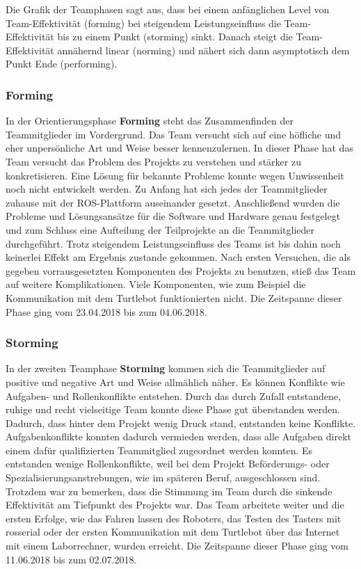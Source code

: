 \documentclass[a4paper,12pt,headsepline]{scrartcl}
\begin{document}
		Die Grafik der Teamphasen sagt aus, dass bei einem anfänglichen Level von Team-Effektivität (forming) bei steigendem Leistungseinfluss die Team-Effektivität bis zu einem Punkt (storming) sinkt. Danach steigt die Team-Effektivität annähernd linear (norming) und nähert sich dann asymptotisch dem Punkt Ende (performing). 
	\subsubsection{Forming}
		In der Orientierungsphase \textbf{Forming} steht das Zusammenfinden der Teammitglieder im Vordergrund. Das Team versucht sich auf eine höfliche und eher unpersönliche Art und Weise besser kennenzulernen. In dieser Phase hat das Team versucht das Problem des Projekts zu verstehen und stärker zu konkretisieren. Eine Lösung für bekannte Probleme konnte wegen Unwissenheit noch nicht entwickelt werden. Zu Anfang hat sich jedes der Teammitglieder zuhause mit der ROS-Plattform auseinander gesetzt. Anschließend wurden die Probleme und Lösungsansätze für die Software und Hardware genau festgelegt und zum Schluss eine Aufteilung der Teilprojekte an die Teammitglieder durchgeführt. Trotz steigendem Leistungseinfluss des Teams ist bis dahin noch keinerlei Effekt am Ergebnis zustande gekommen. Nach ersten Versuchen, die als gegeben vorrausgesetzten Komponenten des Projekts zu benutzen, stieß das Team auf weitere Komplikationen. Viele Komponenten, wie zum Beispiel die Kommunikation mit dem Turtlebot funktionierten nicht. Die Zeitspanne dieser Phase ging vom 23.04.2018 bis zum 04.06.2018. 
	\subsubsection{Storming}
		In der zweiten Teamphase \textbf{Storming} kommen sich die Teammitglieder auf positive und negative Art und Weise allmählich näher. Es können Konflikte wie Aufgaben- und Rollenkonflikte entstehen. Durch das durch Zufall entstandene, ruhige und recht vielseitige Team konnte diese Phase gut überstanden werden. Dadurch, dass hinter dem Projekt wenig Druck stand, entstanden keine Konflikte. Aufgabenkonflikte konnten dadurch vermieden werden, dass alle Aufgaben direkt einem dafür qualifizierten Teammitglied zugeordnet werden konnten. Es entstanden wenige Rollenkonflikte, weil bei dem Projekt Beförderungs- oder Spezialisierungsanstrebungen, wie im späteren Beruf, ausgeschlossen sind. Trotzdem war zu bemerken, dass die Stimmung im Team durch die sinkende Effektivität am Tiefpunkt des Projekts war. Das Team arbeitete weiter und die ersten Erfolge, wie das Fahren lassen des Roboters, das Testen des Tasters mit rosserial oder der ersten Kommunikation mit dem Turtlebot über das Internet mit einem Laborrechner, wurden erreicht. Die Zeitspanne dieser Phase ging vom 11.06.2018 bis zum 02.07.2018.
\end{document}
